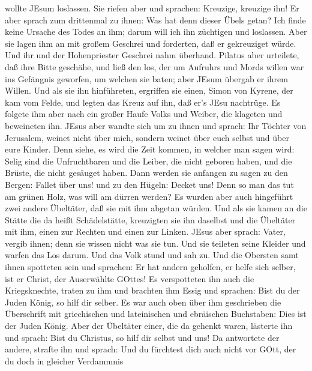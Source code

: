 wollte JEsum loslassen.  Sie riefen aber und sprachen:
Kreuzige, kreuzige ihn!  Er aber sprach zum drittenmal zu
ihnen: Was hat denn dieser Übels getan? Ich finde keine Ursache des
Todes an ihm; darum will ich ihn züchtigen und loslassen. 
Aber sie lagen ihm an mit großem Geschrei und forderten, daß er
gekreuziget würde. Und ihr und der Hohenpriester Geschrei nahm überhand.
 Pilatus aber urteilete, daß ihre Bitte geschähe,
 und ließ den los, der um Aufruhrs und Mords willen war ins
Gefängnis geworfen, um welchen sie baten; aber JEsum übergab er ihrem
Willen.  Und als sie ihn hinführeten, ergriffen sie einen,
Simon von Kyrene, der kam vom Felde, und legten das Kreuz auf ihn, daß
er's JEsu nachtrüge.  Es folgete ihm aber nach ein großer
Haufe Volks und Weiber, die klageten und beweineten ihn. 
JEsus aber wandte sich um zu ihnen und sprach: Ihr Töchter von
Jerusalem, weinet nicht über mich, sondern weinet über euch selbst und
über eure Kinder.  Denn siehe, es wird die Zeit kommen, in
welcher man sagen wird: Selig sind die Unfruchtbaren und die Leiber, die
nicht geboren haben, und die Brüste, die nicht gesäuget haben.
 Dann werden sie anfangen zu sagen zu den Bergen: Fallet
über uns! und zu den Hügeln: Decket uns!  Denn so man das
tut am grünen Holz, was will am dürren werden?  Es wurden
aber auch hingeführt zwei andere Übeltäter, daß sie mit ihm abgetan
würden.  Und als sie kamen an die Stätte die da heißt
Schädelstätte, kreuzigten sie ihn daselbst und die Übeltäter mit ihm,
einen zur Rechten und einen zur Linken.  JEsus aber sprach:
Vater, vergib ihnen; denn sie wissen nicht was sie tun. Und sie teileten
seine Kleider und warfen das Los darum.  Und das Volk stund
und sah zu. Und die Obersten samt ihnen spotteten sein und sprachen: Er
hat andern geholfen, er helfe sich selber, ist er Christ, der
Auserwählte GOttes!  Es verspotteten ihn auch die
Kriegsknechte, traten zu ihm und brachten ihm Essig  und
sprachen: Bist du der Juden König, so hilf dir selber.  Es
war auch oben über ihm geschrieben die Überschrift mit griechischen und
lateinischen und ebräischen Buchstaben: Dies ist der Juden König.
 Aber der Übeltäter einer, die da gehenkt waren, lästerte
ihn und sprach: Bist du Christus, so hilf dir selbst und uns!
 Da antwortete der andere, strafte ihn und sprach: Und du
fürchtest dich auch nicht vor GOtt, der du doch in gleicher Verdammnis
